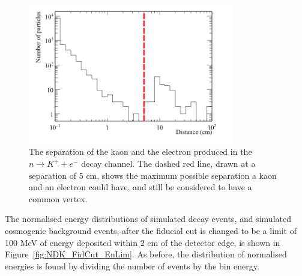 \begin{figure}
  \centering
  \includegraphics[width=0.8\textwidth]{NucleonDecay_KaonElecSep}
  \caption[The separation of the kaon and the electron produced in the $n \rightarrow K^{+} + e^{-}$ decay channel]
          {The separation of the kaon and the electron produced in the $n \rightarrow K^{+} + e^{-}$ decay channel. The dashed red line, drawn at a separation of 5 cm, shows the maximum possible separation a kaon and an electron could have, and still be considered to have a common vertex.}
  \label{fig:NDK_Sig_KEDist}
\end{figure}

The normalised energy distributions of simulated decay events, and simulated cosmogenic background events, after the fiducial cut is changed to be a limit of 100 MeV of energy deposited within 2 cm of the detector edge, is shown in Figure~\ref{fig:NDK_FidCut_EnLim}. As before, the distribution of normalised energies is found by dividing the number of events by the bin energy. \\

